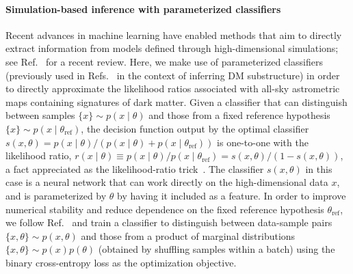 \documentclass[]{article}
\begin{document}
\paragraph{Simulation-based inference with parameterized classifiers} Recent advances in machine learning have enabled methods that aim to directly extract information from models defined through high-dimensional simulations; see Ref.~\cite{Cranmer:2019eaq} for a recent review. Here, we make use of parameterized classifiers~\cite{Cranmer:2015bka,Baldi:2016fzo,Brehmer:2018eca,Brehmer:2018hga,Brehmer:2018kdj,Hermans:2019ioj} (previously used in Refs.~\cite{Brehmer:2019jyt,Hermans:2020skz} in the context of inferring DM substructure) in order to directly approximate the likelihood ratios associated with all-sky astrometric maps containing signatures of dark matter. Given a classifier that can distinguish between samples $\{x\} \sim p(x\mid\theta)$ and those from a fixed reference hypothesis $\{x\} \sim p(x\mid\theta_\mathrm{ref})$, the decision function output by the optimal classifier $s(x, \theta) = {p(x\mid\theta)}/{\left(p(x\mid\theta) + p(x\mid\theta_\mathrm{ref})\right)}$ is one-to-one with the likelihood ratio, $r(x\mid \theta) \equiv {p(x\mid\theta)}/{p(x\mid\theta_\mathrm{ref})}  = {s(x, \theta)}/{\left(1 - s(x, \theta)\right)}$, a fact appreciated as the likelihood-ratio trick~\cite{Cranmer:2015bka,mohamed2017learning}. 
%
The classifier $s(x, \theta)$ in this case is a neural network that can work directly on the high-dimensional data $x$, and is parameterized by $\theta$ by having it included as a feature. In order to improve numerical stability and reduce dependence on the fixed reference hypothesis $\theta_\mathrm{ref}$, we follow Ref.~\cite{Hermans:2019ioj} and train a classifier to distinguish between data-sample pairs $\{x, \theta\} \sim p(x,\theta)$ and those from a product of marginal distributions $\{x, \theta\} \sim p(x)p(\theta)$ (obtained by shuffling samples within a batch) using the binary cross-entropy loss as the optimization objective. 
\end{document}

